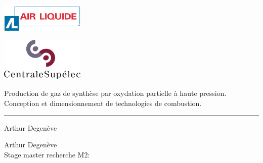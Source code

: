 \documentclass[10pt,a4paper,twoside,frenchb,english]{book}                %
\begin{document}
\graphicspath{{fig/}}

% 
 \thispagestyle{empty}   %
% 
 \noindent
 \begin{minipage}{3cm}%
   \includegraphics*[width=4cm]{AirLogo}%
 \end{minipage}\hfill
 \begin{minipage}{8cm}
 \raggedleft
\includegraphics*[width=4cm]{CenLogo}%

 \end{minipage}
% 
\bigskip
   \begin{flushleft}
     \Large \textsf{Production de gaz de synthèse par oxydation partielle à haute pression. \\
Conception et dimensionnement de technologies de combustion.}

   \end{flushleft}
 \hrule
% 
 \bigskip
   \LARGE\noindent \textsf{Arthur Degenève} \hfill
 \bigskip
% 
% 
 \normalsize
% 
 \vfill
 \begin{minipage}{2.0cm}%

 \end{minipage}\hfill
 \begin{minipage}{9cm}
 \raggedleft
 \textsf{Arthur Degenève \\
 Stage master recherche M2: }
 \end{minipage}


\end{document}
